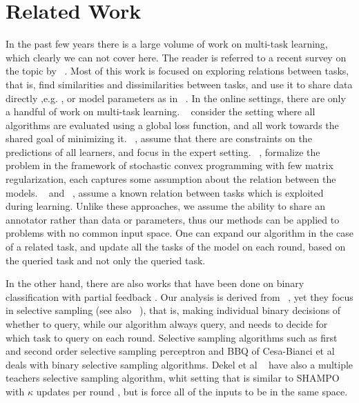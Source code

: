 \chapter{Related Work}

In the past few years there is a large volume of work on multi-task learning, which clearly we can not 
cover here. The reader is referred to a recent survey on the topic by ~\cite{10.1109/TKDE.2009.191}. 
Most of this work is focused on exploring relations between tasks, that is, 
find similarities and dissimilarities  between tasks, and use it to share data directly ,e.g. 
\cite{NIPS2012_0706}, or model parameters as in ~\cite{Evgeniou:2004:RML:1014052.1014067,Daume:2010:FES:1870526.1870534,DBLP:journals/ml/ArgyriouEP08}. 
In the online settings, there are only a handful of work on multi-task learning. 
~\cite{DBLP:conf/colt/DekelLS06} consider the setting where all algorithms are evaluated using a 
global loss function, and all work towards the shared goal of minimizing it. 
~\cite{DBLP:conf/colt/LugosiPS09}, assume that there are constraints on the predictions of all 
learners, and focus in the expert setting. ~\cite{Agarwal:EECS-2008-138}, formalize the 
problem in the framework of stochastic convex programming with few matrix regularization, each 
captures some assumption about the relation between the models. 
~\cite{DBLP:journals/jmlr/CavallantiCG10} and ~\cite{cesa2006incremental}, 
assume a known relation between tasks which is exploited during learning. 
Unlike these approaches, we assume the ability to share an annotator rather than data or parameters, 
thus our methods can be applied to problems with no common input space. One can 
expand our algorithm in the case of a related task, and update all the tasks of the model  on each round, 
based on the queried task and not only the queried task.

In the other hand, there are also works that have been done on binary classification with partial feedback . 
Our analysis is derived from ~\cite{cesa2006worst}, yet they focus in selective 
sampling (see also ~\cite{cesa2009robust,dekel2010robust,crammer2014doubly}), that is, making individual 
binary decisions of whether to query, while our algorithm always query, and needs to decide for which task 
to query on each round.
Selective sampling algorithms such as first and second order selective sampling perceptron and   
BBQ  of Cesa-Bianci et al~\cite{cesa2006worst,cesa2009robust} deals with binary selective 
sampling algorithms. Dekel et al ~\cite{dekel2010robust} have also a multiple teachers selective sampling 
algorithm, whit setting that is similar to SHAMPO with $\kappa$ updates per round , but is force all of the 
inputs to be in the same space.

